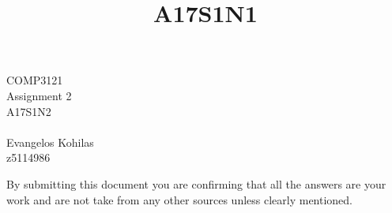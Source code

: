 \documentclass{article}
\title{A17S1N1}
\begin{document}
\begin{center}
    \begin{LARGE}
        COMP3121\\
        Assignment 2\\
        A17S1N2\\
        \hrulefill\\
        Evangelos Kohilas\\
        z5114986\\
        \hrulefill
    \end{LARGE}

    \begin{large}
        By submitting this document you are confirming that all the answers are your work and are not take from any other sources unless clearly mentioned.
    \end{large}

\end{center}
\end{document}
